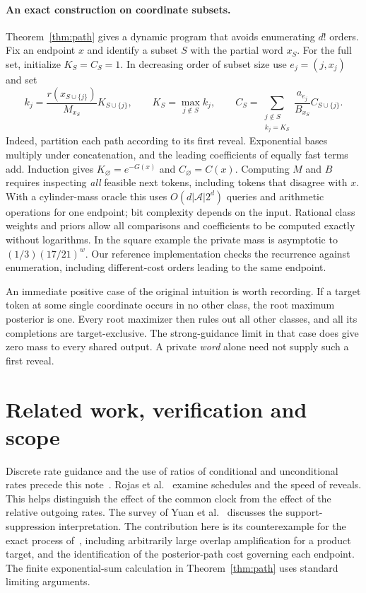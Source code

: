 \documentclass[11pt]{article}
\begin{document}
\paragraph{An exact construction on coordinate subsets.}
Theorem~\ref{thm:path} gives a dynamic program that avoids enumerating \(d!\) orders. Fix an endpoint \(x\) and identify a subset \(S\) with the partial word \(x_S\). For the full set, initialize \(K_S=C_S=1\). In decreasing order of subset size use \(e_j=(j,x_j)\) and set
\[
 k_j=\frac{r(x_{S\cup\{j\}})}{M_{x_S}}K_{S\cup\{j\}},\qquad
 K_S=\max_{j\notin S} k_j,\qquad
 C_S=\sum_{\substack{j\notin S\\ k_j=K_S}}
       \frac{a_{e_j}}{B_{x_S}} C_{S\cup\{j\}} .
\]
Indeed, partition each path according to its first reveal. Exponential bases multiply under concatenation, and the leading coefficients of equally fast terms add. Induction gives \(K_\varnothing=e^{-G(x)}\) and \(C_\varnothing=C(x)\). Computing \(M\) and \(B\) requires inspecting \emph{all} feasible next tokens, including tokens that disagree with \(x\). With a cylinder-mass oracle this uses \(O(d|\mathcal A|2^d)\) queries and arithmetic operations for one endpoint; bit complexity depends on the input. Rational class weights and priors allow all comparisons and coefficients to be computed exactly without logarithms. In the square example the private mass is asymptotic to \((1/3)(17/21)^w\). Our reference implementation checks the recurrence against enumeration, including different-cost orders leading to the same endpoint.

An immediate positive case of the original intuition is worth recording. If a target token at some single coordinate occurs in no other class, the root maximum posterior is one. Every root maximizer then rules out all other classes, and all its completions are target-exclusive. The strong-guidance limit in that case does give zero mass to every shared output. A private \emph{word} alone need not supply such a first reveal.

\section{Related work, verification and scope}
Discrete rate guidance and the use of ratios of conditional and unconditional rates precede this note~\cite{nisonoff,schiff}. Rojas et al.~\cite{rojas} examine schedules and the speed of reveals. This helps distinguish the effect of the common clock from the effect of the relative outgoing rates. The survey of Yuan et al.~\cite{yuan} discusses the support-suppression interpretation. The contribution here is its counterexample for the exact process of~\cite{he}, including arbitrarily large overlap amplification for a product target, and the identification of the posterior-path cost governing each endpoint. The finite exponential-sum calculation in Theorem~\ref{thm:path} uses standard limiting arguments.
\end{document}
